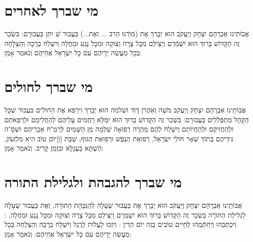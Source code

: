 \documentclass[a4paper, twoside, openany, parskip=half, 10pt]{article}
\begin{document}
\section*{מי שברך לאחרים}
 אֲבוֹתֵינוּ אַבְרָהָם יִצְחָק וְיַעֲקֹב הוּא יְבָרֵךְ אֶת (מוׂרֵנוּ הַרב ... וְאֶת...) בַּעֲבוּר  שְׁ
  יִתֵּן 
   בַּעֲבוּרָם: בִּשְׂכַר זֶה הַקָּדוֹשׁ בָּרוּךְ הוּא יִשְׁמְֿרֵם וְיַצִּילֵם מִכָּל צָרָה וְצוּקָה וּמִכָּל נֶגַע וּמַחֲלָה
  וְיִשְׁלַח בְּרָכָה וְהַצְלָחָה בְּכָל מַעֲשֵׂה יְדֵיהֶם עִם כָּל יִשְׂרָאֵל אֶחֵיהֶם וְנֹאמַר אָמֵן:\\

\section*{מי שברך לחולים}
 אֲבוֹתֵינוּ אַבְרָהָם יִצְחָק וְיַעֲקֹב מֹשֶׁה וְאַהֲרֹן דָּוִד וּשְׁלֹמֹה הוּא יְבָרֵךְ וִירַפֵּא אֶת הַחוׂלִים 
בּעֲבוּר שְׁכָּל הַקָּהָל מִתְפַּלְֿלִים בַּעֲבוּרָם:  בִּשְׂכַר זֶה
 הַקָּדוֹשׁ בָּרוּךְ הוּא יִמָּלֵּא רַחֲמִים עָלֵיהֶם לְהַחֲלִימַם וּלְרַפְּאֹתַם וּלְהַחֲזִיקַם וּלְהַחֲיוֹתַם וְיִשְׁלַח לְהֶם מְהֵרָה רְפוּאָה שְׁלֵמָה מִן הַשָּׁמַיִם לְרַמַ"ח אֵבָרֵיהֶם וּשְׁסָ"ה גִּידֵיהֶם בְּתוֹךְ שְׁאָר חוֹלֵי יִשְׂרָאֵל, רְפוּאַת הַנֶּפֶשׁ וּרְפוּאַת הַגּוּף,
 \colorbox{sometimes}{שַׁבָּת}
 \colorbox{sometimes}{[וְ]יוׂם טוׂב}
 \colorbox{sometimes}{
 הִיא מִלִזְעׂק,
}
  הַשְׁתָּא בַּעֲגָלָא וּבִזְמַן קָרִיב. וְנֹאמַר אָמֵן:\\

\section*{מי שברך להגבהת ולגלילת התורה}
 אֲבוֹתֵֽינוּ אַבְרָהָם יִצְחָק וְיַעֲקֹב הוּא יְבָרֵךְ אֶת 
  בַּעֲבוּר שֶׁעָלָה לִהַגְּבָּהַת הַתּוׂרָה, וֽאֶת 
   בַּעֲבוּר שֶׁעָלָה לִגְלִילַת הַתּוׂרָה
 בִּשְׂכַר זֶה הַקָּדוֹשׁ בָּרוּךְ הוּא יִשְׁמְרֵם וְיַצִּילֵם מִכָּל צָרָה וְצוּקָה וּמִכָּל נֶֽגַע וּמַחֲלָה,
 \colorbox{sometimes}{
 :
וְיִכְתְּבֵהוּ וְיַחְתְּֿמֵֽהוּ לְחַיִים טוׂבִים בְּזֶה יוׂם הַדִין}
\colorbox{sometimes}{
:
וְיִזְכּוּ לָעֳלוׂת לְרֶֽגֶל
}
וְיִשְׁלַח בְּרָכָה וְהַצְלָחָה בְּכָל מַעֲשֵׂה יָדֵיהֶם
  עִם כָּל יִשְׂרָאֵל אֶחֵיהֶם: וְנֹאמַר אָמֵן:\\
\end{document}
